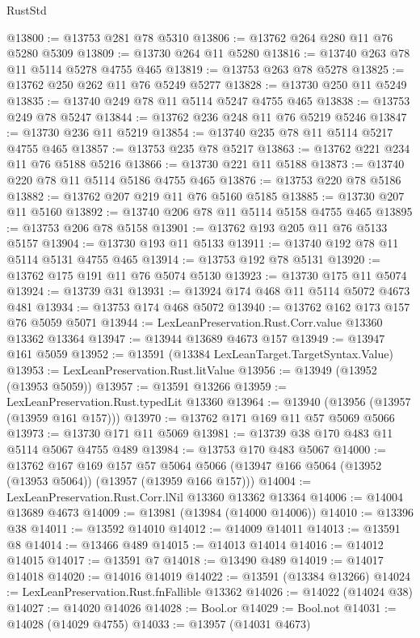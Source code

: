 \begin{lexlean}{RustStd}
\begin{coremodule}
@13800 := @13753 @281 @78 @5310
@13806 := @13762 @264 @280 @11 @76 @5280 @5309
@13809 := @13730 @264 @11 @5280
@13816 := @13740 @263 @78 @11 @5114 @5278 @4755 @465
@13819 := @13753 @263 @78 @5278
@13825 := @13762 @250 @262 @11 @76 @5249 @5277
@13828 := @13730 @250 @11 @5249
@13835 := @13740 @249 @78 @11 @5114 @5247 @4755 @465
@13838 := @13753 @249 @78 @5247
@13844 := @13762 @236 @248 @11 @76 @5219 @5246
@13847 := @13730 @236 @11 @5219
@13854 := @13740 @235 @78 @11 @5114 @5217 @4755 @465
@13857 := @13753 @235 @78 @5217
@13863 := @13762 @221 @234 @11 @76 @5188 @5216
@13866 := @13730 @221 @11 @5188
@13873 := @13740 @220 @78 @11 @5114 @5186 @4755 @465
@13876 := @13753 @220 @78 @5186
@13882 := @13762 @207 @219 @11 @76 @5160 @5185
@13885 := @13730 @207 @11 @5160
@13892 := @13740 @206 @78 @11 @5114 @5158 @4755 @465
@13895 := @13753 @206 @78 @5158
@13901 := @13762 @193 @205 @11 @76 @5133 @5157
@13904 := @13730 @193 @11 @5133
@13911 := @13740 @192 @78 @11 @5114 @5131 @4755 @465
@13914 := @13753 @192 @78 @5131
@13920 := @13762 @175 @191 @11 @76 @5074 @5130
@13923 := @13730 @175 @11 @5074
@13924 := @13739 @31
@13931 := @13924 @174 @468 @11 @5114 @5072 @4673 @481
@13934 := @13753 @174 @468 @5072
@13940 := @13762 @162 @173 @157 @76 @5059 @5071
@13944 := LexLeanPreservation.Rust.Corr.value @13360 @13362 @13364
@13947 := @13944 @13689 @4673 @157
@13949 := @13947 @161 @5059
@13952 := @13591 (@13384 LexLeanTarget.TargetSyntax.Value)
@13953 := LexLeanPreservation.Rust.litValue
@13956 := @13949 (@13952 (@13953 @5059))
@13957 := @13591 @13266
@13959 := LexLeanPreservation.Rust.typedLit @13360
@13964 := @13940 (@13956 (@13957 (@13959 @161 @157)))
@13970 := @13762 @171 @169 @11 @57 @5069 @5066
@13973 := @13730 @171 @11 @5069
@13981 := @13739 @38 @170 @483 @11 @5114 @5067 @4755 @489
@13984 := @13753 @170 @483 @5067
@14000 := @13762
    @167
    @169
    @157
    @57
    @5064
    @5066
    (@13947 @166 @5064 (@13952 (@13953 @5064)) (@13957 (@13959 @166 @157)))
@14004 := LexLeanPreservation.Rust.Corr.lNil @13360 @13362 @13364
@14006 := @14004 @13689 @4673
@14009 := @13981 (@13984 (@14000 @14006))
@14010 := @13396 @38
@14011 := @13592 @14010
@14012 := @14009 @14011
@14013 := @13591 @8
@14014 := @13466 @489
@14015 := @14013 @14014
@14016 := @14012 @14015
@14017 := @13591 @7
@14018 := @13490 @489
@14019 := @14017 @14018
@14020 := @14016 @14019
@14022 := @13591 (@13384 @13266)
@14024 := LexLeanPreservation.Rust.fnFallible @13362
@14026 := @14022 (@14024 @38)
@14027 := @14020 @14026
@14028 := Bool.or
@14029 := Bool.not
@14031 := @14028 (@14029 @4755)
@14033 := @13957 (@14031 @4673)

\end{coremodule}
\end{lexlean}
